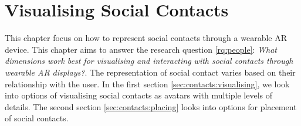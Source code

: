 \chapter{Visualising Social Contacts}
\label{ch:contacts} 

This chapter focus on how to represent social contacts through a wearable AR device. 
This chapter aims to answer the research question \ref{rq:people}: \textit{What dimensions work best for visualising and interacting with social contacts through wearable AR displays?}.
The representation of social contact varies based on their relationship with the user. 
In the first section \ref{sec:contacts:visualising}, we look into options of visualising social contacts as avatars with multiple levels of details. The second section \ref{sec:contacts:placing} looks into options for placement of social contacts. 





